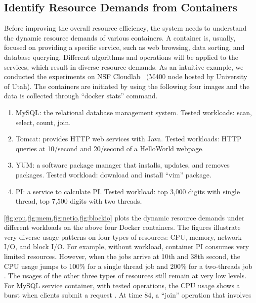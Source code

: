 \subsection{Identify Resource Demands from Containers}
\label{understand}
Before improving the overall resource efficiency, the system needs to understand the dynamic resource demands of various containers.
A container is, usually, focused on providing a specific service, such as web browsing, data sorting, and database querying.
Different algorithms and operations will be applied to the services, which result in diverse resource demands.
As an intuitive example, we conducted the experiments on NSF Cloudlab~\cite{cloudlab} (M400 node hosted by University of Utah).
The containers are initiated by using the following four images and the data is collected through ``docker stats'' command.
\begin{enumerate}
 \item MySQL: the relational database management system. Tested workloads: scan, select, count, join.
 \item Tomcat: provides HTTP web services with Java. Tested workloads: HTTP queries at 10/second and 20/second of a HelloWorld webpage.
 \item YUM: a software package manager that installs, updates, and removes packages. Tested workload: download and install ``vim'' package. 
 \item PI: a service to calculate PI. Tested workload: top 3,000 digits with single thread, top 7,500 digits with two threads. \added{[What is PI?. Do you mean $\pi$ ?]]}
\end{enumerate}
\cref{fig:cpu,fig:mem,fig:netio,fig:blockio} plots the dynamic resource demands under different workloads on the above four Docker containers.
The figures illustrate very diverse usage patterns on four types of resources: CPU, memory, network I/O, and block I/O.
For example, without workload, container PI consumes very limited resources. However, when the jobs arrive at 10th and 38th second, the CPU usage
jumps to 100\% for a single thread job and 200\% for a two-threads job . The usages of the other three types of resources still remain at very low levels.
For MySQL service container, with tested operations, the CPU usage shows a burst when clients submit a request . At time 84, a ``join'' operation that involves
